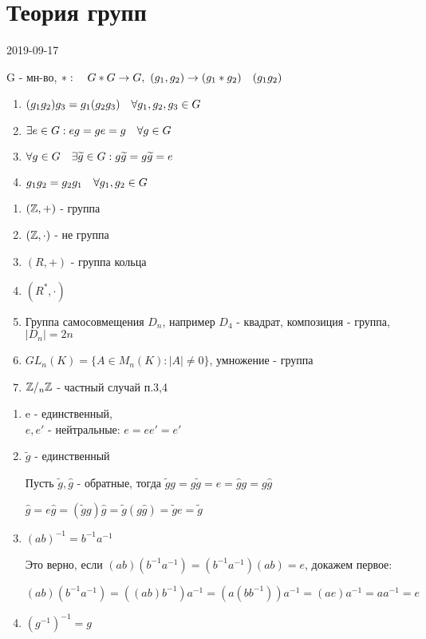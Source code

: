 \documentclass[main]{subfiles}
\begin{document}
  \section{Теория групп}
  2019-09-17
  \begin{definition}[группа]
      G - мн-во, $*: \quad G*G \rightarrow G,\ (g_1, g_2) \rightarrow (g_1*g_2)\quad (g_1g_2)$
      \begin{enumerate}
      	\item $(g_1g_2)g_3 = g_1(g_2g_3) \quad \forall g_1, g_2, g_3 \in G$
      	\item $\exists e \in G : eg = ge = g \quad \forall g \in G$
      	\item $\forall g \in G \quad \exists \widetilde{g} \in G : g\widetilde{g} = g \widetilde{g} = e$
      	\item $g_1g_2 = g_2g_1 \quad \forall g_1, g_2 \in G$
  	\end{enumerate}
  \end{definition}

  \begin{examples}
      \begin{enumerate}
          \item $(\mathbb{Z},+)$ - группа
          \item $(\mathbb{Z}, \cdot)$ - не группа
          \item $(R, +)$ - группа кольца
          \item $(R^*, \cdot)$
          \item Группа самосовмещения $D_n$, например $D_4$ - квадрат, композиция - группа, $|D_n|=2n$
          \item $GL_n(K) = \{A \in M_n(K) : |A| \neq 0\}$, умножение - группа
          \item $\mathbb{Z}/_n \mathbb{Z}$ - частный случай п.3,4
      \end{enumerate}
  \end{examples}

  \begin{theorem}
      \begin{enumerate}
          \item e - единственный, \\
              $e,e'$ - нейтральные: $e=e e'=e'$
          \item $\widetilde{g}$ - единственный

          Пусть $\widetilde{g},\hat{g}$ - обратные, тогда $\widetilde{g}g = g\widetilde{g} = e = \hat{g}g = g\hat{g}$

          $\hat{g}=e \hat{g}=(\widetilde{g}g)\hat{g}=\widetilde{g}(g\hat{g})=\widetilde{g}e=\widetilde{g}$
          \item $(a b)^{-1}=b^{-1}a^{-1}$

          Это верно, если $(ab)(b^{-1}a^{-1})=(b^{-1}a^{-1})(ab)=e$, докажем первое:

          $(ab)(b^{-1}a^{-1})=((ab)b^{-1})a^{-1}=(a(bb^{-1}))a^{-1}=(ae)a^{-1}=a a^{-1}=e$
          \item $(g^{-1})^{-1}=g$
      \end{enumerate}
  \end{theorem}
\end{document}
